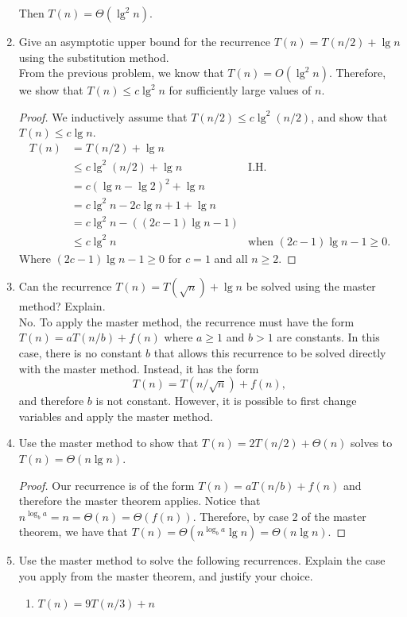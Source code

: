 \documentclass[letterpaper,11pt]{article}
\begin{document}
\begin{enumerate}
Then $T(n) = \Theta(\lg^2n)$.
\newpage
\item Give an asymptotic upper bound for the recurrence $T(n) = T(n/2) + \lg n$ using the substitution method.\\

From the previous problem, we know that $T(n) = O(\lg^2n)$. Therefore, we show that $T(n) \leq c\lg^2n$ for sufficiently large values of $n$.

\begin{proof}
We inductively assume that $T(n/2) \leq c\lg^2(n/2)$, and show that $T(n)\leq c\lg n$.
\begin{align*}
T(n) &= T(n/2) + \lg n \\
     &\leq c\lg^2(n/2) + \lg n& \text{I.H.}\\
     &= c(\lg n - \lg 2)^2 + \lg n\\
     &= c\lg^2n - 2c\lg n + 1 + \lg n\\
     &= c\lg^2n - ((2c - 1)\lg n -1)\\
     &\leq c\lg^2 n& \text{when }(2c - 1)\lg n -1 \geq 0.
\end{align*}
Where $(2c - 1)\lg n -1 \geq 0$ for $c=1$ and all $n \geq 2$.
\end{proof}

\item Can the recurrence $T(n) = T(\sqrt{n}) + \lg n$ be solved using the master method? Explain.\\

No. To apply the master method, the recurrence must have the form $T(n) = aT(n/b) + f(n)$ where $a\geq 1$ and $b>1$ are constants. In this case, there is no constant $b$ that allows this recurrence to be solved directly with the master method. Instead, it has the form \[T(n) = T(n/\sqrt{n}) + f(n),\] and therefore $b$ is not constant. However, it is possible to first change variables and apply the master method.
\item Use the master method to show that $T(n) = 2T(n/2) + \Theta(n)$ solves to\\ $T(n) = \Theta(n\lg n)$.\\

\begin{proof}
Our recurrence is of the form $T(n) = aT(n/b) + f(n)$ and therefore the master theorem applies. Notice that $n^{\log_ba} = n = \Theta(n) = \Theta(f(n))$. Therefore, by case 2 of the master theorem, we have that $T(n) = \Theta(n^{\log_ba}\lg n) = \Theta(n\lg n)$.
\end{proof}
\newpage
\item Use the master method to solve the following recurrences. Explain the case you apply from the master theorem, and justify your choice.
\begin{enumerate}
\item $T(n) = 9T(n/3) + n$\\


\end{enumerate}
\end{enumerate}
\end{document}
